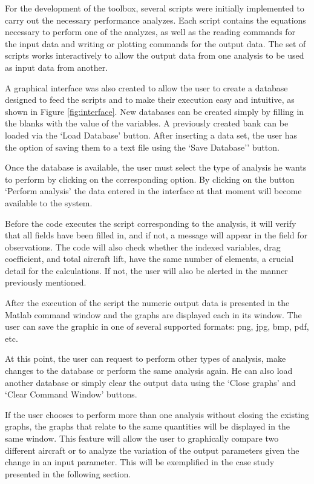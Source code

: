 \documentclass[10pt]{SelfArx} %
\begin{document}
For the development of the {toolbox}, several {scripts} were initially implemented to carry out the necessary performance analyzes. Each {script} contains the equations necessary to perform one of the analyzes, as well as the reading commands for the input data and writing or plotting commands for the output data. The set of {scripts} works interactively to allow the output data from one analysis to be used as input data from another.

A graphical interface was also created to allow the user to create a database designed to feed the {scripts} and to make their execution easy and intuitive, as shown in Figure \ref{fig:interface}. New databases can be created simply by filling in the blanks with the value of the variables. A previously created bank can be loaded via the `Load Database' button. After inserting a data set, the user has the option of saving them to a text file using the `Save Database'' button.

Once the database is available, the user must select the type of analysis he wants to perform by clicking on the corresponding option. By clicking on the button `Perform analysis' the data entered in the interface at that moment will become available to the system.

Before the code executes the {script} corresponding to the analysis, it will verify that all fields have been filled in, and if not, a  message will appear in the field for observations. The code will also check whether the indexed variables, drag coefficient, and total aircraft lift, have the same number of elements, a crucial detail for the calculations. If not, the user will also be alerted in the manner previously mentioned.


After the execution of the {script} the numeric output data is presented in the Matlab command window and the graphs are displayed each in its window. The user can save the graphic in one of several supported formats: png, jpg, bmp, pdf, etc.

At this point, the user can request to perform other types of analysis, make changes to the database or perform the same analysis again. He can also load another database or simply clear the output data using the `Close graphs' and `Clear Command Window' buttons. 

If the user chooses to perform more than one analysis without closing the existing graphs, the graphs that relate to the same quantities will be displayed in the same window. This feature will allow the user to graphically compare two different aircraft or to analyze the variation of the output parameters given the change in an input parameter. This will be exemplified in the case study presented in the following section.
\end{document}
